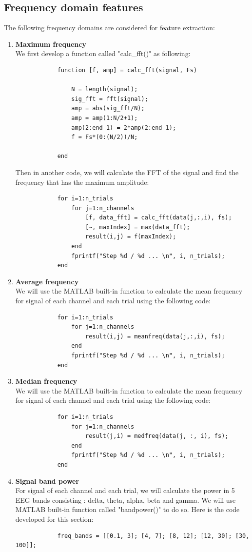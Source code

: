 \documentclass[]{article}
\begin{document}
	\subsection{Frequency domain features}
	The following frequency domains are considered for feature extraction:
	\begin{enumerate}
		\item \textbf{Maximum frequency}\\
		We first develop a function called "calc\_fft()" as following:
		\begin{lstlisting}
			function [f, amp] = calc_fft(signal, Fs)
			
				N = length(signal);
				sig_fft = fft(signal);
				amp = abs(sig_fft/N);
				amp = amp(1:N/2+1);
				amp(2:end-1) = 2*amp(2:end-1);
				f = Fs*(0:(N/2))/N;
				
			end
		\end{lstlisting}
		Then in another code, we will calculate the FFT of the signal and find the frequency that has the maximum amplitude:
		\begin{lstlisting}
			for i=1:n_trials
				for j=1:n_channels
					[f, data_fft] = calc_fft(data(j,:,i), fs);
					[~, maxIndex] = max(data_fft);
					result(i,j) = f(maxIndex);
				end
				fprintf("Step %d / %d ... \n", i, n_trials);
			end
		\end{lstlisting}
	
		\item \textbf{Average frequency}\\
		We will use the MATLAB built-in function to calculate the mean frequency for signal of each channel and each trial using the following code:
		\begin{lstlisting}
			for i=1:n_trials
				for j=1:n_channels
					result(i,j) = meanfreq(data(j,:,i), fs);
				end
				fprintf("Step %d / %d ... \n", i, n_trials);
			end
		\end{lstlisting}
	
		\item \textbf{Median frequency}\\
		We will use the MATLAB built-in function to calculate the mean frequency for signal of each channel and each trial using the following code:
		\begin{lstlisting}
			for i=1:n_trials
				for j=1:n_channels
					result(j,i) = medfreq(data(j, :, i), fs);
				end
				fprintf("Step %d / %d ... \n", i, n_trials);
			end
		\end{lstlisting}
	
		\item \textbf{Signal band power}\\
		For signal of each channel and each trial, we will calculate the power in 5 EEG bands consisting : delta, theta, alpha, beta and gamma. We will use MATLAB built-in function called "bandpower()" to do so. Here is the code developed for this section:
		\begin{lstlisting}
			freq_bands = [[0.1, 3]; [4, 7]; [8, 12]; [12, 30]; [30, 100]];
			

\end{lstlisting}
\end{enumerate}
\end{document}
